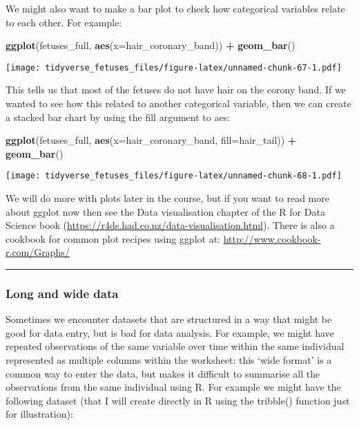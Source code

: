 \documentclass[
]{article}
\newenvironment{Shaded}{\begin{snugshade}}{\end{snugshade}}
\newcommand{\DataTypeTok}[1]{\textcolor[rgb]{0.13,0.29,0.53}{#1}}
\newcommand{\KeywordTok}[1]{\textcolor[rgb]{0.13,0.29,0.53}{\textbf{#1}}}
\newcommand{\NormalTok}[1]{#1}
\newcommand{\OperatorTok}[1]{\textcolor[rgb]{0.81,0.36,0.00}{\textbf{#1}}}
\newcommand{\StringTok}[1]{\textcolor[rgb]{0.31,0.60,0.02}{#1}}
\begin{document}
We might also want to make a bar plot to check how categorical variables
relate to each other. For example:

\begin{Shaded}
\begin{Highlighting}[]
\KeywordTok{ggplot}\NormalTok{(fetuses_full, }\KeywordTok{aes}\NormalTok{(}\DataTypeTok{x=}\NormalTok{hair_coronary_band)) }\OperatorTok{+}
\StringTok{    }\KeywordTok{geom_bar}\NormalTok{()}
\end{Highlighting}
\end{Shaded}

\texttt{[image: tidyverse\_fetuses\_files/figure-latex/unnamed-chunk-67-1.pdf]}

This tells us that most of the fetuses do not have hair on the corony
band. If we wanted to see how this related to another categorical
variable, then we can create a stacked bar chart by using the fill
argument to aes:

\begin{Shaded}
\begin{Highlighting}[]
\KeywordTok{ggplot}\NormalTok{(fetuses_full, }\KeywordTok{aes}\NormalTok{(}\DataTypeTok{x=}\NormalTok{hair_coronary_band, }\DataTypeTok{fill=}\NormalTok{hair_tail)) }\OperatorTok{+}
\StringTok{    }\KeywordTok{geom_bar}\NormalTok{()}
\end{Highlighting}
\end{Shaded}

\texttt{[image: tidyverse\_fetuses\_files/figure-latex/unnamed-chunk-68-1.pdf]}

We will do more with plots later in the course, but if you want to read
more about ggplot now then see the Data visualisation chapter of the R
for Data Science book
(\url{https://r4ds.had.co.nz/data-visualisation.html}). There is also a
cookbook for common plot recipes using ggplot at:
\url{http://www.cookbook-r.com/Graphs/}

\begin{center}\rule{0.5\linewidth}{0.5pt}\end{center}

\hypertarget{long-and-wide-data}{%
\subsubsection{Long and wide data}\label{long-and-wide-data}}

Sometimes we encounter datasets that are structured in a way that might
be good for data entry, but is bad for data analysis. For example, we
might have repeated observations of the same variable over time within
the same individual represented as multiple columns within the
worksheet: this `wide format' is a common way to enter the data, but
makes it difficult to summarise all the observations from the same
individual using R. For example we might have the following dataset
(that I will create directly in R using the tribble() function just for
illustration):
\end{document}

